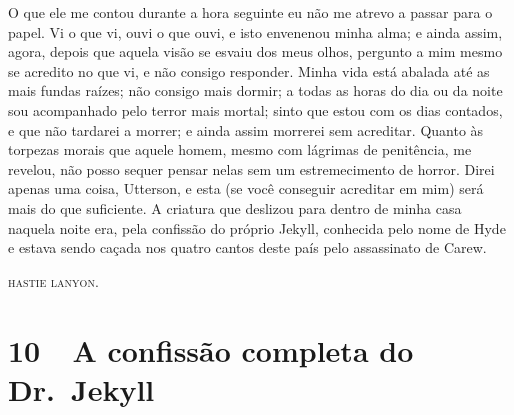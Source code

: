 O que ele me contou durante a hora seguinte eu não me atrevo a passar
para o papel.  Vi o que vi, ouvi o que ouvi, e isto envenenou minha
alma; e ainda assim, agora, depois que aquela visão se esvaiu dos meus
olhos, pergunto a mim mesmo se acredito no que vi, e não consigo
responder.  Minha vida está abalada até as mais fundas raízes; não
consigo mais dormir; a todas as horas do dia ou da noite sou
acompanhado pelo terror mais mortal; sinto que estou com os dias
contados, e que não tardarei a morrer; e ainda assim morrerei sem
acreditar.  Quanto às torpezas morais que aquele homem, mesmo com
lágrimas de penitência, me revelou, não posso sequer pensar nelas sem
um estremecimento de horror.  Direi apenas uma coisa, Utterson, e esta
(se você conseguir acreditar em mim) será mais do que suficiente.  A
criatura que deslizou para dentro de minha casa naquela noite era, pela
confissão do próprio Jekyll, conhecida pelo nome de Hyde e estava sendo
caçada nos quatro cantos deste país pelo assassinato de Carew.

\textsc{hastie lanyon}.


\chapter[10\ \  A confissão completa do Dr.~Jekyll]{10\ \ A confissão completa do Dr.~Jekyll}

